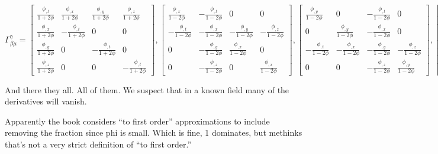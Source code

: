 \documentclass[landscape,letterpaper,10pt,english]{article}
\begin{document}
\[ \Gamma^{\gamma}_{\beta\mu} = \begin{bmatrix}
\frac{\phi_{,t}}{1+2\phi} & \frac{\phi_{,x}}{1+2\phi} & \frac{\phi_{,y}}{1+2\phi} & \frac{\phi_{,z}}{1+2\phi} \\ 
\frac{\phi_{,x}}{1+2\phi} & -\frac{\phi_{,t}}{1+2\phi} & 0 & 0 \\
\frac{\phi_{,y}}{1+2\phi} & 0 & -\frac{\phi_{,t}}{1+2\phi} & 0 \\
\frac{\phi_{,z}}{1+2\phi} & 0 & 0 & -\frac{\phi_{,t}}{1+2\phi}
\end{bmatrix},\begin{bmatrix}
\frac{\phi_{,x}}{1-2\phi} & -\frac{\phi_{,t}}{1-2\phi} & 0 & 0 \\ 
-\frac{\phi_{,t}}{1-2\phi} & -\frac{\phi_{,x}}{1-2\phi} & -\frac{\phi_{,y}}{1-2\phi} & -\frac{\phi_{,z}}{1-2\phi} \\
0 & -\frac{\phi_{,y}}{1-2\phi} & \frac{\phi_{,x}}{1-2\phi} & 0 \\
0 & -\frac{\phi_{,z}}{1-2\phi} & 0 & \frac{\phi_{,x}}{1-2\phi}
\end{bmatrix},\begin{bmatrix}
\frac{\phi_{,y}}{1-2\phi} & 0 & -\frac{\phi_{,t}}{1-2\phi} & 0 \\ 
0 & \frac{\phi_{,y}}{1-2\phi} & -\frac{\phi_{,x}}{1-2\phi} & 0 \\
-\frac{\phi_{,t}}{1-2\phi} & -\frac{\phi_{,x}}{1-2\phi} & -\frac{\phi_{,y}}{1-2\phi} & -\frac{\phi_{,z}}{1-2\phi} \\
0 & 0 & -\frac{\phi_{,z}}{1-2\phi} & \frac{\phi_{,y}}{1-2\phi}
\end{bmatrix},\begin{bmatrix}
\frac{\phi_{,z}}{1-2\phi} & 0 & 0 & -\frac{\phi_{,t}}{1-2\phi} \\ 
0 & \frac{\phi_{,z}}{1-2\phi} & 0 & -\frac{\phi_{,x}}{1-2\phi} \\
0 & 0 & \frac{\phi_{,z}}{1-2\phi} & -\frac{\phi_{,y}}{1-2\phi} \\
-\frac{\phi_{,t}}{1-2\phi} & -\frac{\phi_{,x}}{1-2\phi} & -\frac{\phi_{,y}}{1-2\phi} & -\frac{\phi_{,z}}{1-2\phi}
\end{bmatrix}
\]

    And there they all. All of them. We suspect that in a known field many
of the derivatives will vanish.

Apparently the book considers ``to first order'' approximations to
include removing the fraction since phi is small. Which is fine, 1
dominates, but methinks that's not a very strict definition of ``to
first order.''
\end{document}
